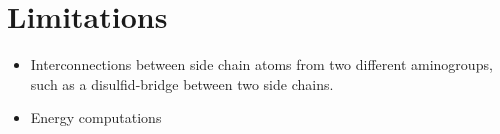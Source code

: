 \documentclass[10pt,a4paper,final,twoside,openany,article]{memoir}
\begin{document}
\section{Limitations}
\begin{itemize}
\item Interconnections between side chain atoms from two different
  aminogroups, such as a disulfid-bridge between two side chains.
\item Energy computations
\end{itemize}





\end{document}
